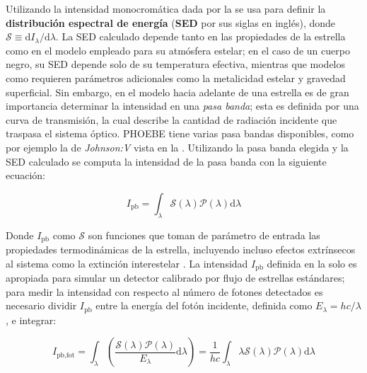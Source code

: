 Utilizando la intensidad monocromática dada por la
 se usa para definir la
\textbf{distribución espectral de energía} (\textbf{SED} por sus siglas en
inglés), donde $\mathcal{S} \equiv \mathrm{d}I_{\lambda}/\mathrm{d}\lambda$. La
SED calculado depende tanto en las propiedades de la estrella como en el modelo
empleado para su atmósfera estelar; en el caso de un cuerpo negro, su SED
depende solo de su temperatura efectiva, mientras que modelos como
 requieren parámetros adicionales como la
metalicidad estelar y gravedad superficial. Sin embargo, en el modelo hacia
adelante de una estrella es de gran importancia determinar la intensidad en una
\textit{pasa banda}; esta es definida por una curva de transmisión, la cual
describe la cantidad de radiación incidente que traspasa el sistema óptico.
PHOEBE tiene varias pasa bandas disponibles, como por ejemplo la de
\textit{Johnson:V} vista en la .
Utilizando la pasa banda elegida y la SED calculado se computa la intensidad de
la pasa banda con la siguiente ecuación:

\begin{eqfloat}
	\centering
	\begin{equation}
		I_{\textrm{pb}} = \int_{\lambda}{\mathcal{S}(\lambda) \mathcal{P}(\lambda)\textrm{d}\lambda}
	\end{equation}
	\blankcaption
	\label{ecuacionIntensidadPasabanda}
\end{eqfloat}

Donde $I_{\mathrm{pb}}$ como $\mathcal{S}$ son funciones que toman de parámetro
de entrada las propiedades termodinámicas de la estrella, incluyendo incluso
efectos extrínsecos al sistema como la extinción interestelar
. La intensidad
$I_{\mathrm{pb}}$ definida en la  solo
es apropiada para simular un detector calibrado por flujo de estrellas
estándares; para medir la intensidad con respecto al número de fotones
detectados es necesario dividir $I_{\mathrm{pb}}$ entre la energía del fotón
incidente, definida como $E_{\lambda} = hc/\lambda$, e integrar:

\begin{eqfloat}
	\centering
	\begin{equation}
		I_{\textrm{pb}, \textrm{fot}} = \int_{\lambda}{\left(\frac{\mathcal{S}(\lambda) \mathcal{P}(\lambda)}{E_{\lambda}}\textrm{d}\lambda \right)} = \frac{1}{hc} \int_{\lambda}{\lambda \mathcal{S}(\lambda) \mathcal{P}(\lambda) \textrm{d}\lambda}
	\end{equation}
\end{eqfloat}

